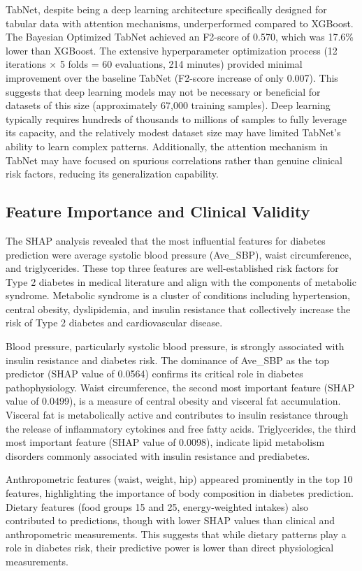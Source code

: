TabNet, despite being a deep learning architecture specifically designed for tabular data with attention mechanisms, underperformed compared to XGBoost. The Bayesian Optimized TabNet achieved an F2-score of 0.570, which was 17.6\% lower than XGBoost. The extensive hyperparameter optimization process (12 iterations $\times$ 5 folds = 60 evaluations, 214 minutes) provided minimal improvement over the baseline TabNet (F2-score increase of only 0.007). This suggests that deep learning models may not be necessary or beneficial for datasets of this size (approximately 67,000 training samples). Deep learning typically requires hundreds of thousands to millions of samples to fully leverage its capacity, and the relatively modest dataset size may have limited TabNet's ability to learn complex patterns. Additionally, the attention mechanism in TabNet may have focused on spurious correlations rather than genuine clinical risk factors, reducing its generalization capability.

\subsection{Feature Importance and Clinical Validity}

The SHAP analysis revealed that the most influential features for diabetes prediction were average systolic blood pressure (Ave\_SBP), waist circumference, and triglycerides. These top three features are well-established risk factors for Type 2 diabetes in medical literature and align with the components of metabolic syndrome. Metabolic syndrome is a cluster of conditions including hypertension, central obesity, dyslipidemia, and insulin resistance that collectively increase the risk of Type 2 diabetes and cardiovascular disease.

Blood pressure, particularly systolic blood pressure, is strongly associated with insulin resistance and diabetes risk. The dominance of Ave\_SBP as the top predictor (SHAP value of 0.0564) confirms its critical role in diabetes pathophysiology. Waist circumference, the second most important feature (SHAP value of 0.0499), is a measure of central obesity and visceral fat accumulation. Visceral fat is metabolically active and contributes to insulin resistance through the release of inflammatory cytokines and free fatty acids. Triglycerides, the third most important feature (SHAP value of 0.0098), indicate lipid metabolism disorders commonly associated with insulin resistance and prediabetes.

Anthropometric features (waist, weight, hip) appeared prominently in the top 10 features, highlighting the importance of body composition in diabetes prediction. Dietary features (food groups 15 and 25, energy-weighted intakes) also contributed to predictions, though with lower SHAP values than clinical and anthropometric measurements. This suggests that while dietary patterns play a role in diabetes risk, their predictive power is lower than direct physiological measurements.

